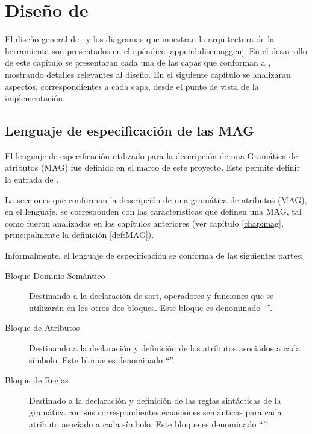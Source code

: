 \chapter{Diseño de \maggen}
\label{chap:disen_}
\minitoc

El diseño general de \maggen\ y los diagramas que muestran la arquitectura de la herramienta son presentados en el apéndice \ref{append:disemaggen}. En el desarrollo de este capítulo se presentaran cada una de las capas que conforman a \maggen, mostrando detalles relevantes al diseño. En el siguiente capítulo se analizaran aspectos, correspondientes a cada capa, desde el punto de vista de la implementación.
 
\section{Lenguaje de especificación de las MAG}
\label{sec:lenguajeMAG}

El lenguaje de especificación utilizado para la descripción de una Gramática de atributos (MAG) fue definido en el marco de este proyecto. Este permite definir la entrada de \maggen.
 
La secciones que conforman la descripción de una gramática de atributos (MAG), en el lenguaje, se corresponden con las características que definen una MAG, tal como fueron analizados en los capítulos anteriores (ver capítulo \ref{chap:mag}, principalmente la definición \ref{def:MAG}).
 
Informalmente, el lenguaje de especificación se conforma de las siguientes partes:

\begin{description}
\item [Bloque Dominio Semántico] Destinando a la declaración de sort, operadores y funciones que se utilizarán en los otros dos bloques. Este bloque es denominado ``''.

\item [Bloque de Atributos] Destinando a la declaración y definición de los atributos asociados a cada símbolo. Este bloque es denominado ``''.

\item [Bloque de Reglas] Destinado a la declaración y definición de las reglas sintácticas de la gramática con sus correspondientes ecuaciones semánticas para cada atributo asociado a cada símbolo. Este bloque es denominado ``''.
\end{description}

